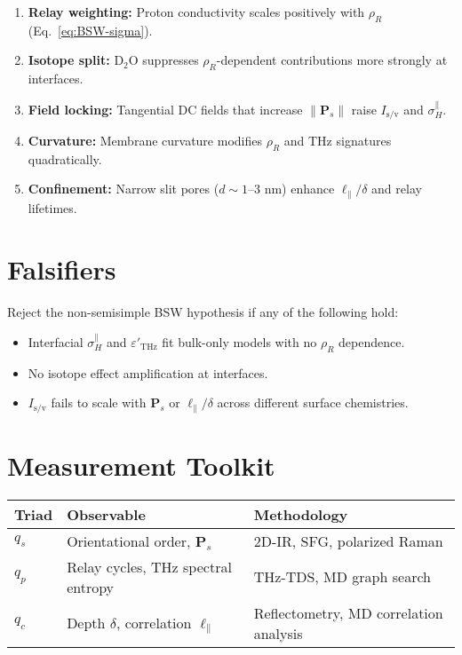 \documentclass[12pt,oneside]{memoir}
\theoremstyle{plain}
\theoremstyle{definition}
\theoremstyle{remark}
\newcommand{\Isv}{\ensuremath{I_{\mathrm{s}/\mathrm{v}}}}
\begin{document}
\begin{enumerate}[label=\textbf{P\arabic*}.]
\item \textbf{Relay weighting:} Proton conductivity scales positively with $\rho_R$ (Eq.~\ref{eq:BSW-sigma}).
\item \textbf{Isotope split:} D$_2$O suppresses $\rho_R$-dependent contributions more strongly at interfaces.
\item \textbf{Field locking:} Tangential DC fields that increase $\|\mathbf{P}_s\|$ raise $\Isv$ and $\sigma_H^{\parallel}$.
\item \textbf{Curvature:} Membrane curvature modifies $\rho_R$ and THz signatures quadratically.
\item \textbf{Confinement:} Narrow slit pores ($d \sim 1$--3 nm) enhance $\ell_\parallel/\delta$ and relay lifetimes.
\end{enumerate}

\section{Falsifiers}

Reject the non-semisimple BSW hypothesis if any of the following hold:
\begin{itemize}
\item Interfacial $\sigma_H^{\parallel}$ and $\varepsilon'_{\mathrm{THz}}$ fit bulk-only models with no $\rho_R$ dependence.
\item No isotope effect amplification at interfaces.
\item $\Isv$ fails to scale with $\mathbf{P}_s$ or $\ell_\parallel/\delta$ across different surface chemistries.
\end{itemize}

\section{Measurement Toolkit}

\begin{center}
\begin{tabular}{@{}lll@{}}
\toprule
Triad & Observable & Methodology \\
\midrule
$q_s$ & Orientational order, $\mathbf{P}_s$ & 2D-IR, SFG, polarized Raman \\
$q_p$ & Relay cycles, THz spectral entropy & THz-TDS, MD graph search \\
$q_c$ & Depth $\delta$, correlation $\ell_\parallel$ & Reflectometry, MD correlation analysis \\
\bottomrule
\end{tabular}
\end{center}
\end{document}
